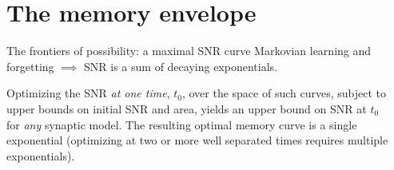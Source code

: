 \documentclass[final,hyperref={pdfpagelabels=false,bookmarks=false}]{beamer}
\begin{document}
\begin{frame}{}
\begin{columns}[t]
\begin{column}{0.37\linewidth}
\end{column}

\begin{column}{0.32\linewidth}



\section{The memory envelope}



\begin{block}{The frontiers of possibility: a maximal SNR curve}
%
 Markovian learning and forgetting $\implies$ SNR is a sum of decaying exponentials.

 \vp Optimizing the SNR \emph{at one time}, $t_0$, over the space of such curves,
 subject to upper bounds on initial SNR and area,
 yields an upper bound on SNR at $t_0$ for \emph{any} synaptic model.
 The resulting optimal memory curve is a single exponential
 (optimizing at two or more well separated times requires multiple exponentials).


\end{block}
\end{column}
\end{columns}
\end{frame}
\end{document}
